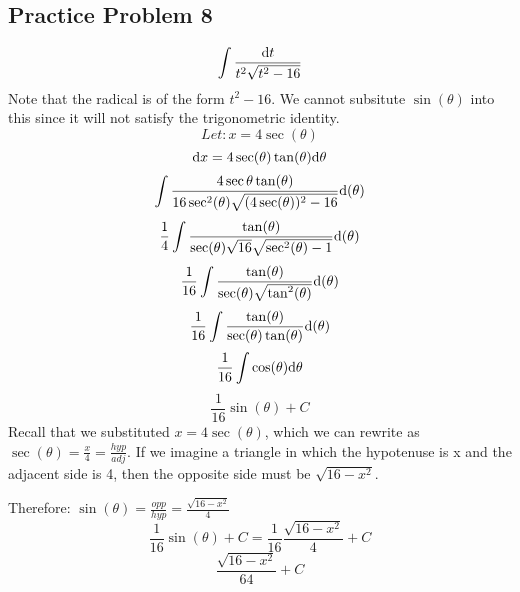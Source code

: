 \documentclass[letterpaper, 12pt]{math}
\begin{document}
\subsection*{Practice Problem 8}
\[ \int{\frac{\mathrm{d}{t}}{t^{2}\sqrt{t^{2}-16}}} \]
Note that the radical is of the form \( t^{2}-16 \). We cannot subsitute
\( \sin(\theta) \) into this since it will not satisfy the trigonometric
identity.
\[ Let: x = 4\sec(\theta) \]
\[ \mathrm{d}{x} = 4\sec(\theta)\tan(\theta)\mathrm{d}{\theta} \]
\[ \int{\frac{4\sec{\theta}\tan(\theta)}
   {16\sec^{2}(\theta)\sqrt{(4\sec(\theta))^{2}-16}}\mathrm{d}(\theta)} \]
\[ \frac{1}{4}\int{\frac{\tan(\theta)}
   {\sec(\theta)\sqrt{16}\sqrt{\sec^{2}(\theta)-1}}\mathrm{d}(\theta)} \]
\[ \frac{1}{16}\int{\frac{\tan(\theta)}
   {\sec(\theta)\sqrt{\tan^{2}(\theta)}}\mathrm{d}(\theta)} \]
\[ \frac{1}{16}\int{\frac{\tan(\theta)}
   {\sec(\theta)\tan(\theta)}\mathrm{d}(\theta)} \]
\[ \frac{1}{16}\int{\cos(\theta)\mathrm{d}{\theta}} \]
\[ \frac{1}{16}\sin(\theta)+C \]
Recall that we substituted \( x = 4\sec(\theta) \), which we can rewrite as
\( \sec(\theta) = \frac{x}{4} = \frac{hyp}{adj} \). If we imagine a triangle in
which the hypotenuse is x and the adjacent side is 4, then the opposite side
must be \( \sqrt{16-x^{2}} \).
\begin{center}
\end{center}
Therefore: \( \sin(\theta) = \frac{opp}{hyp} = \frac{\sqrt{16-x^{2}}}{4} \)
\[ \frac{1}{16}\sin(\theta)+C = \frac{1}{16}\frac{\sqrt{16-x^{2}}}{4}+C \]
\[ \frac{\sqrt{16-x^{2}}}{64}+C \]
\end{document}
